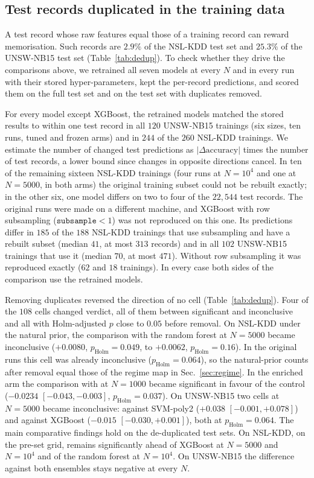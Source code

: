 \subsection{Test records duplicated in the training data}\label{sec:res-dedup}



A test record whose raw features equal those of a training record can reward memorisation.
Such records are $2.9\%$ of the NSL-KDD test set and $25.3\%$ of the UNSW-NB15 test set
(Table~\ref{tab:dedup}). To check whether they drive the comparisons above, we retrained all
seven models at every $N$ and in every run with their stored hyper-parameters, kept the
per-record predictions, and scored them on the full test set and on the test set with duplicates
removed.

For every model except XGBoost, the retrained models matched the stored results to within one
test record in all $120$ UNSW-NB15 trainings (six sizes, ten runs, tuned and frozen arms) and in
$244$ of the $260$ NSL-KDD trainings. We estimate the number of changed test predictions as
$|\Delta\mathrm{accuracy}|$ times the number of test records, a lower bound since changes in
opposite directions cancel. In ten of the remaining sixteen NSL-KDD trainings (four runs at
$N=10^4$ and one at $N=5000$, in both arms) the original training subset could not be rebuilt
exactly; in the other six, one model differs on two to four of the $22{,}544$ test records. The
original runs were made on a different machine, and XGBoost with row subsampling
($\texttt{subsample}<1$) was not reproduced on this one. Its predictions differ in $185$ of the
$188$ NSL-KDD trainings that use subsampling and have a rebuilt subset (median $41$, at most
$313$ records) and in all $102$ UNSW-NB15 trainings that use it (median $70$, at most $471$).
Without row subsampling it was reproduced exactly ($62$ and $18$ trainings). In every case both
sides of the comparison use the retrained models.

Removing duplicates reversed the direction of no cell (Table~\ref{tab:dedup}). Four of the
$108$ cells changed verdict, all of them between significant and inconclusive and all with
Holm-adjusted $p$ close to $0.05$ before removal. On NSL-KDD under the natural prior, the
comparison with the random forest at $N=5000$ became inconclusive ($+0.0080$,
$p_{\mathrm{Holm}}=0.049$, to $+0.0062$, $p_{\mathrm{Holm}}=0.16$). In the original runs this
cell was already inconclusive ($p_{\mathrm{Holm}}=0.064$), so the natural-prior counts after
removal equal those of the regime map in Sec.~\ref{sec:regime}. In the enriched arm the
comparison with \QSVMZ{} at $N=1000$ became significant in favour of the control
($-0.0234$ $[-0.043,-0.003]$, $p_{\mathrm{Holm}}=0.037$). On UNSW-NB15 two cells at $N=5000$
became inconclusive: against SVM-poly2 ($+0.038$ $[-0.001,+0.078]$) and against XGBoost
($-0.015$ $[-0.030,+0.001]$), both at $p_{\mathrm{Holm}}=0.064$. The main comparative findings
hold on the de-duplicated test sets. On NSL-KDD, on the pre-set grid, \QSVM{} remains
significantly ahead of XGBoost at $N=5000$ and $N=10^4$ and of the random forest at $N=10^4$. On UNSW-NB15 the difference
against both ensembles stays negative at every $N$.

